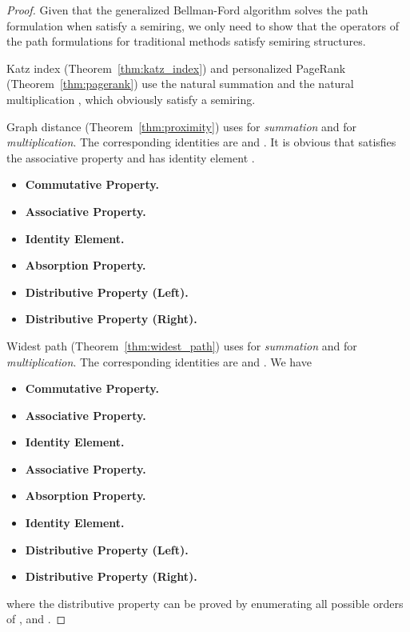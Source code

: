 \bellman*
\begin{proof}
Given that the generalized Bellman-Ford algorithm solves the path formulation when  satisfy a semiring, we only need to show that the operators of the path formulations for traditional methods satisfy semiring structures.

Katz index (Theorem~\ref{thm:katz_index}) and personalized PageRank (Theorem~\ref{thm:pagerank}) use the natural summation  and the natural multiplication , which obviously satisfy a semiring.

Graph distance (Theorem~\ref{thm:proximity}) uses  for \emph{summation} and  for \emph{multiplication}. The corresponding identities are  and . It is obvious that  satisfies the associative property and has identity element .
\begin{itemize}
    \setlength{\parskip}{0pt}
    \setlength{\itemsep}{0pt plus 1pt}
    \item \textbf{Commutative Property.} 
    \item \textbf{Associative Property.} 
    \item \textbf{Identity Element.} 
    \item \textbf{Absorption Property.} 
    \item \textbf{Distributive Property (Left).} 
    \item \textbf{Distributive Property (Right).} 
\end{itemize}

Widest path (Theorem~\ref{thm:widest_path}) uses  for \emph{summation} and  for \emph{multiplication}. The corresponding identities are  and . We have
\begin{itemize}
    \setlength{\parskip}{0pt}
    \setlength{\itemsep}{0pt plus 1pt}
    \item \textbf{Commutative Property.} 
    \item \textbf{Associative Property.} 
    \item \textbf{Identity Element.} 
    \item \textbf{Associative Property.} 
    \item \textbf{Absorption Property.} 
    \item \textbf{Identity Element.} 
    \item \textbf{Distributive Property (Left).} 
    \item \textbf{Distributive Property (Right).} 
\end{itemize}
where the distributive property can be proved by enumerating all possible orders of ,  and .


\end{proof}
